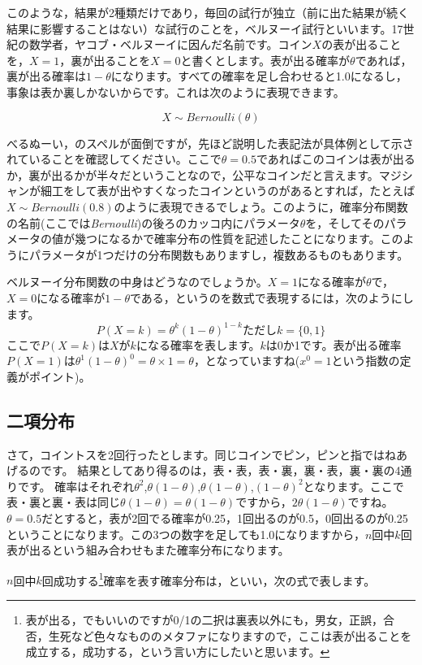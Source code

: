 \documentclass{ltjbook}
\begin{document}
このような，結果が2種類だけであり，毎回の試行が独立（前に出た結果が続く結果に影響することはない）な試行のことを，ベルヌーイ試行といいます。17世紀の数学者，ヤコブ・ベルヌーイに因んだ名前です。コイン$X$の表が出ることを，$X=1$，裏が出ることを$X=0$と書くとします。表が出る確率が$\theta$であれば，裏が出る確率は$1-\theta$になります。すべての確率を足し合わせると1.0になるし，事象は表か裏しかないからです。これは次のように表現できます。

\[ X \sim Bernoulli(\theta) \]

べるぬーい，のスペルが面倒ですが，先ほど説明した表記法が具体例として示されていることを確認してください。ここで$\theta=0.5$であればこのコインは表が出るか，裏が出るかが半々だということなので，公平なコインだと言えます。マジシャンが細工をして表が出やすくなったコインというのがあるとすれば，たとえば$X \sim Bernoulli(0.8)$のように表現できるでしょう。このように，確率分布関数の名前(ここでは\textit{Bernoulli})の後ろのカッコ内にパラメータ$\theta$を，そしてそのパラメータの値が幾つになるかで確率分布の性質を記述したことになります。このようにパラメータが1つだけの分布関数もありますし，複数あるものもあります。

ベルヌーイ分布関数の中身はどうなのでしょうか。$X=1$になる確率が$\theta$で，$X=0$になる確率が$1-\theta$である，というのを数式で表現するには，次のようにします。
\[  P(X=k) = \theta^k(1-\theta)^{1-k} \mbox{ただし$k=\{0,1\}$} \]
ここで$P(X=k)$は$X$が$k$になる確率を表します。$k$は0か1です。表が出る確率$P(X=1)$は$\theta^1(1-\theta)^0=\theta \times 1=\theta$，となっていますね($x^0=1$という指数の定義がポイント)。

\subsection{二項分布}
さて，コイントスを2回行ったとします。同じコインでピン，ピンと指ではねあげるのです。
結果としてあり得るのは，表・表，表・裏，裏・表，裏・裏の4通りです。
確率はそれぞれ$\theta^2$,$\theta(1-\theta)$,$\theta(1-\theta)$,$(1-\theta)^2$となります。ここで表・裏と裏・表は同じ$\theta(1-\theta)=\theta(1-\theta)$ですから，$2\theta(1-\theta)$ですね。$\theta=0.5$だとすると，表が2回でる確率が0.25，1回出るのが0.5，0回出るのが0.25ということになります。この3つの数字を足しても1.0になりますから，$n$回中$k$回表が出るという組み合わせもまた確率分布になります。

$n$回中$k$回成功する\footnote{表が出る，でもいいのですが0/1の二択は裏表以外にも，男女，正誤，合否，生死など色々なもののメタファになりますので，ここは表が出ることを成立する，成功する，という言い方にしたいと思います。}確率を表す確率分布は，といい，次の式で表します。
\end{document}
